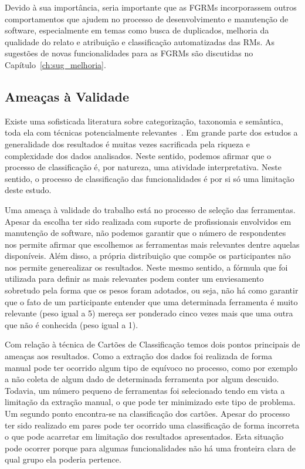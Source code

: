 Devido à sua importância, seria importante que as FGRMs incorporassem outros
comportamentos que ajudem no processo de desenvolvimento e manutenção de
software, especialmente em temas como busca de duplicados, melhoria da qualidade
do relato e atribuição e classificação automatizadas das RMs. As sugestões de
novas funcionalidades para as FGRMs são discutidas no
Capítulo~\ref{ch:sug_melhoria}.

\subsection{Ameaças à Validade}
\label{sec:ameacas_a_validade}

Existe uma sofisticada literatura sobre categorização, taxonomia e semântica,
toda ela com técnicas potencialmente relevantes~\cite{rugg2005sorting}. Em
grande parte dos estudos a generalidade dos resultados é muitas vezes
sacrificada pela riqueza e complexidade dos dados analisados. Neste sentido,
podemos afirmar que o processo de classificação é, por natureza, uma atividade
interpretativa. Neste sentido, o processo de classificação das funcionalidades
é por si só uma limitação deste estudo.

Uma ameaça à validade do trabalho está no processo de seleção das ferramentas.
Apesar da escolha ter sido realizada com suporte de profissionais envolvidos em
manutenção de software, não podemos garantir que o número de respondentes nos
permite afirmar que escolhemos as ferramentas mais relevantes dentre aquelas
disponíveis. Além disso, a própria distribuição que compõe os participantes não
nos permite generealizar os resultados. Neste mesmo sentido, a fórmula que foi
utilizada para definir as mais relevantes podem conter um enviesamento
sobretudo pela forma que os pesos foram adotados, ou seja, não há como garantir
que o fato de um participante entender que uma determinada ferramenta é muito
relevante (peso igual a 5) mereça ser ponderado cinco vezes mais que uma outra
que não é conhecida (peso igual a 1).

Com relação à técnica de Cartões de Classificação temos dois pontos principais
de ameaças aos resultados. Como a extração dos dados foi realizada de forma
manual pode ter ocorrido algum tipo de equívoco no processo, como por exemplo a
não coleta de algum dado de determinada ferramenta por algum descuido. Todavia,
um número pequeno de ferramentas foi selecionado tendo em vista a limitação da
extração manual, o que pode ter minimizado este tipo de problema. Um segundo
ponto encontra-se na classificação dos cartões. Apesar do processo ter sido
realizado em pares pode ter ocorrido uma classificação de forma incorreta o que
pode acarretar em limitação dos resultados apresentados. Esta situação pode
ocorrer porque para algumas funcionalidades não há uma fronteira clara de qual
grupo ela poderia pertence.

